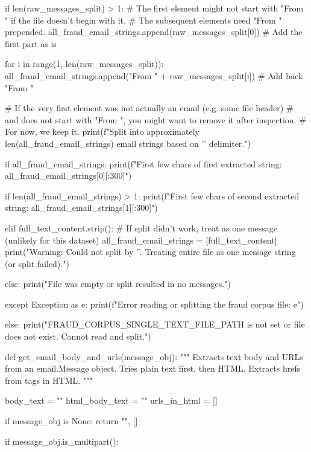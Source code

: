 \begin{ffcode}
            if len(raw_messages_split) > 1:
                # The first element might not start with "From " if the file doesn't begin with it.
                # The subsequent elements need "From " prepended.
                all_fraud_email_strings.append(raw_messages_split[0]) # Add the first part as is
    
                for i in range(1, len(raw_messages_split)):
                    all_fraud_email_strings.append("From " + raw_messages_split[i]) # Add back "From "
    
                # If the very first element was not actually an email (e.g. some file header)
                # and does not start with "From ", you might want to remove it after inspection.
                # For now, we keep it.
                print(f"Split into approximately {len(all_fraud_email_strings)} email strings based on '\nFrom ' delimiter.")
    
                if all_fraud_email_strings:
                    print(f"First few chars of first extracted string: {all_fraud_email_strings[0][:300]}")
    
                    if len(all_fraud_email_strings) > 1:
                         print(f"First few chars of second extracted string: {all_fraud_email_strings[1][:300]}")
    
            elif full_text_content.strip(): # If split didn't work, treat as one message (unlikely for this dataset)
                all_fraud_email_strings = [full_text_content]
                print("Warning: Could not split by '\nFrom '. Treating entire file as one message string (or split failed).")
    
            else:
                print("File was empty or split resulted in no messages.")
    
        except Exception as e:
            print(f"Error reading or splitting the fraud corpus file: {e}")
    
    else:
        print("FRAUD_CORPUS_SINGLE_TEXT_FILE_PATH is not set or file does not exist. Cannot read and split.")

def get_email_body_and_urls(message_obj):
"""
Extracts text body and URLs from an email.Message object.
Tries plain text first, then HTML. Extracts hrefs from  tags in HTML.
"""

body_text = ""
html_body_text = ""
urls_in_html = []

if message_obj is None: return "", []

if message_obj.is_multipart():


\end{ffcode}
